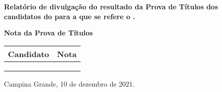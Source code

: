 \documentclass[12pt]{uaefata}
\date{} %
\begin{document}
\begin{letter}{
		\textbf{Relatório de divulgação do resultado da Prova de Títulos dos candidatos do \concurso para \cargo  a que se refere o \edital.}
	}
 
\opening{}

\centering

\textbf{Nota da Prova de Títulos}

\begin{tabular}{|l|r|}
	\hline
	\textbf{Candidato}	&	\textbf{Nota}	\\
	\hline
	\cdta	&	\cdtant	\\
	\cdtb	&	\cdtbnt	\\
	\cdtc	&	\cdtcnt	\\
	\hline
\end{tabular}




\closing{Campina Grande, 10 de dezembro de 2021.}




\end{letter}
\end{document}
